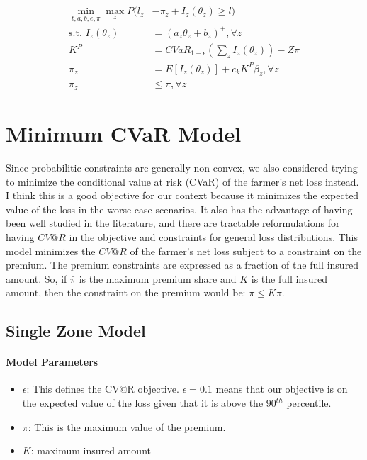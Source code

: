 \documentclass[11pt]{article}
\begin{document}
\begin{align}
    \min_{t,a,b,e,\pi} \max_z P(l_z &- \pi_z +I_z(\theta_z) \geq \bar{l})\\
    \text{s.t.   } I_z(\theta_z) &= (a_z\theta_z + b_z)^+, \forall z\\
    K^P &= CVaR_{1-\epsilon}\left (\sum_z I_z(\theta_z) \right ) - Z\bar{\pi}\\
    \pi_z &= E[I_z(\theta_z)]+c_k K^P \beta_z, \forall z \\
    \pi_z &\leq \bar{\pi}, \forall z
\end{align}

\section{Minimum CVaR Model}
Since probabilitic constraints are generally non-convex, we also considered trying to minimize the conditional value at risk (CVaR) of the farmer's net loss instead. I think this is a good objective for our context because it minimizes the expected value of the loss in the worse case scenarios. It also has the advantage of having been well studied in the literature, and there are tractable reformulations for having $CV@R$ in the objective and constraints for general loss distributions. This model minimizes the $CV@R$ of the farmer's net loss subject to a constraint on the premium. The premium constraints are expressed as a fraction of the full insured amount. So, if $\bar{\pi}$ is the maximum premium share and $K$ is the full insured amount, then the constraint on the premium would be: $\pi \leq K \bar{\pi}$.

\subsection*{Single Zone Model}
\paragraph*{Model Parameters}
\begin{itemize}
    \item $\epsilon$: This defines the CV@R objective. $\epsilon = 0.1$ means that our objective is on the expected value of the loss given that it is above the $90^{th}$ percentile. 
    \item $\bar{\pi}$: This is the maximum value of the premium. 
    \item $K$: maximum insured amount
\end{itemize}
\end{document}
